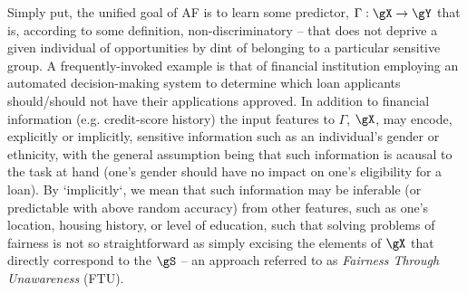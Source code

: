 %

Simply put, the unified goal of AF is to learn some predictor, \(\Gamma: \gX \to \gY \) that
is, according to some definition, non-discriminatory -- that does not deprive a given individual of
opportunities by dint of belonging to a particular sensitive group.
%
A frequently-invoked example is that of financial institution employing an automated
decision-making system to determine which loan applicants should/should not have their applications
approved.
%
In addition to financial information (e.g. credit-score history) the input features to \(\Gamma\),
\(\gX\), may encode, explicitly or implicitly, sensitive information such as an individual's gender
or ethnicity, with the general assumption being that such information is acausal to the task at
hand (one's gender should have no impact on one's eligibility for a loan).
%
By `implicitly`, we mean that such information may be inferable (or predictable with above random
accuracy) from other features, such as one's location, housing history, or level of education, such
that solving problems of fairness is not so straightforward as simply excising the elements of
\(\gX\) that directly correspond to the \(\gS\) -- an approach referred to as \emph{Fairness
Through Unawareness} (FTU).
%


